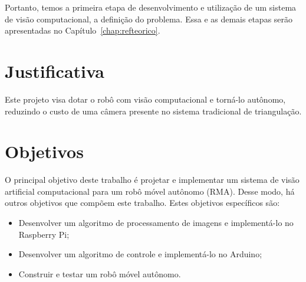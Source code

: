 Portanto, temos a primeira etapa de desenvolvimento e utilização de um sistema de visão computacional, a definição do problema. Essa e as demais etapas serão apresentadas no Capítulo~\ref{chap:refteorico}.

\section{Justificativa}
\label{sec:justi}

Este projeto visa dotar o robô com visão computacional e torná-lo autônomo, reduzindo o custo de uma câmera presente no sistema tradicional de triangulação.

\section{Objetivos}
\label{sec:objt}

O principal objetivo deste trabalho é projetar e implementar um sistema de visão artificial computacional para um robô móvel autônomo (RMA). Desse modo, há outros objetivos que compõem este trabalho. Estes objetivos específicos são:

\begin{itemize}
    \item Desenvolver um algoritmo de processamento de imagens e implementá-lo no Raspberry Pi;
    \item Desenvolver um algoritmo de controle e implementá-lo no Arduino;
    \item Construir e testar um robô móvel autônomo.
\end{itemize}







